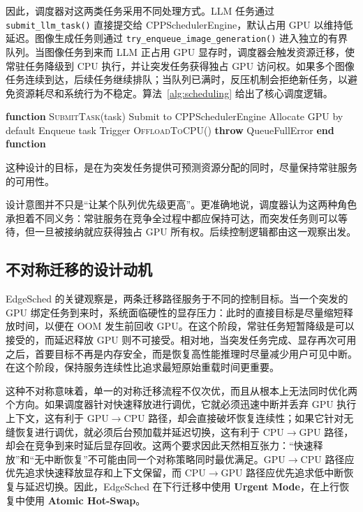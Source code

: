 因此，调度器对这两类任务采用不同处理方式。LLM 任务通过 \texttt{submit\_llm\_task()} 直接提交给 CPPSchedulerEngine，默认占用 GPU 以维持低延迟。图像生成任务则通过 \texttt{try\_enqueue\_image\_generation()} 进入独立的有界队列。当图像任务到来而 LLM 正占用 GPU 显存时，调度器会触发资源迁移，使常驻任务降级到 CPU 执行，并让突发任务获得独占 GPU 访问权。如果多个图像任务连续到达，后续任务继续排队；当队列已满时，反压机制会拒绝新任务，以避免资源耗尽和系统行为不稳定。算法~\ref{alg:scheduling} 给出了核心调度逻辑。

\begin{algorithm}[!t]
\caption{带反压的任务调度}
\label{alg:scheduling}
\begin{algorithmic}[1]
\STATE \textbf{function} \textsc{SubmitTask}(task)
    \STATE Submit to CPPSchedulerEngine
    \STATE Allocate GPU by default
        \STATE Enqueue task
            \STATE Trigger \textsc{OffloadToCPU}()
        \ENDIF
    \ELSE
        \STATE \textbf{throw} QueueFullError
    \ENDIF
\ENDIF
\STATE \textbf{end function}
\end{algorithmic}
\end{algorithm}

这种设计的目标，是在为突发任务提供可预测资源分配的同时，尽量保持常驻服务的可用性。

设计意图并不只是“让某个队列优先级更高”。更准确地说，调度器认为这两种角色承担着不同义务：常驻服务在竞争全过程中都应保持可达，而突发任务则可以等待，但一旦被接纳就应获得独占 GPU 所有权。后续控制逻辑都由这一观察出发。

\subsection{不对称迁移的设计动机}

EdgeSched 的关键观察是，两条迁移路径服务于不同的控制目标。当一个突发的 GPU 绑定任务到来时，系统面临硬性的显存压力：此时的直接目标是尽量缩短释放时间，以便在 OOM 发生前回收 GPU。在这个阶段，常驻任务短暂降级是可以接受的，而延迟释放 GPU 则不可接受。相对地，当突发任务完成、显存再次可用之后，首要目标不再是内存安全，而是恢复高性能推理时尽量减少用户可见中断。在这个阶段，保持服务连续性比追求最短原始重载时间更重要。

这种不对称意味着，单一的对称迁移流程不仅次优，而且从根本上无法同时优化两个方向。如果调度器针对快速释放进行调优，它就必须迅速中断并丢弃 GPU 执行上下文，这有利于 GPU$\rightarrow$CPU 路径，却会直接破坏恢复连续性；如果它针对无缝恢复进行调优，就必须后台预加载并延迟切换，这有利于 CPU$\rightarrow$GPU 路径，却会在竞争到来时延后显存回收。这两个要求因此天然相互张力：“快速释放”和“无中断恢复”不可能由同一个对称策略同时最优满足。GPU$\rightarrow$CPU 路径应优先追求快速释放显存和上下文保留，而 CPU$\rightarrow$GPU 路径应优先追求低中断恢复与延迟切换。因此，EdgeSched 在下行迁移中使用 \textbf{Urgent Mode}，在上行恢复中使用 \textbf{Atomic Hot-Swap}。

